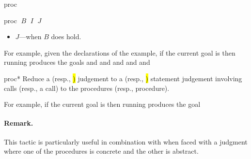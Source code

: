 \begin{tactic}{proc}
\begin{tsyntax}{proc $\;B$ $\;I$ $\;J$}
\begin{itemize}
    \item $J$---when $B$ does hold.
    \end{itemize}

  \medskip
  For example, given the declarations of the  example,
  if the current goal is
   then
  running 
  produces the goals
  and
  and
  and
  and
  and
  \end{tsyntax}

  \begin{tsyntax}{proc*}
    Reduce a \prhl (resp., \hl) judgement to a \prhl (resp., \hl)
    statement judgement involving calls (resp., a call) to the
    procedures (resp., procedure).

  \bigskip
  For example, if the current goal is
   then
  running 
  produces the goal

  \paragraph{Remark.}
  This tactic is particularly useful in combination with
   when faced with a \prhl judgment where one of the
  procedures is concrete and the other is abstract.
  \end{tsyntax}
\end{tactic}
